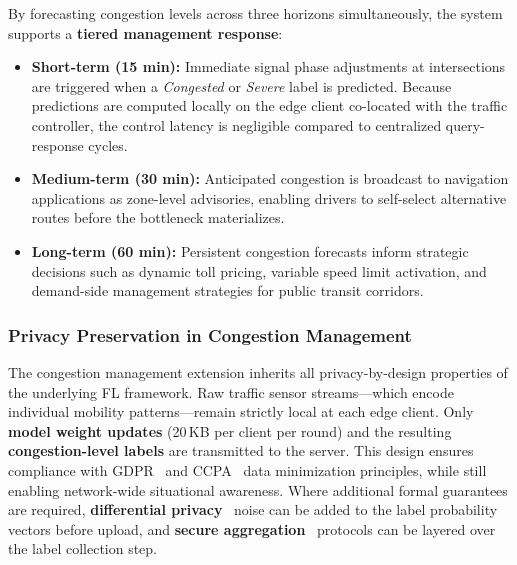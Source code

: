 \documentclass[pdflatex,sn-mathphys-num]{sn-jnl}
\theoremstyle{thmstyleone}
\theoremstyle{thmstyletwo}
\theoremstyle{thmstylethree}
\begin{document}
By forecasting congestion levels across three horizons simultaneously, the system
supports a \textbf{tiered management response}:

\begin{itemize}
    \item \textbf{Short-term (15 min):} Immediate signal phase adjustments at
    intersections are triggered when a \textit{Congested} or \textit{Severe}
    label is predicted. Because predictions are computed locally on the edge
    client co-located with the traffic controller, the control latency is
    negligible compared to centralized query-response cycles.

    \item \textbf{Medium-term (30 min):} Anticipated congestion is broadcast to
    navigation applications as zone-level advisories, enabling drivers to
    self-select alternative routes before the bottleneck materializes.

    \item \textbf{Long-term (60 min):} Persistent congestion forecasts inform
    strategic decisions such as dynamic toll pricing, variable speed limit
    activation, and demand-side management strategies for public transit
    corridors.
\end{itemize}

\subsubsection{Privacy Preservation in Congestion Management}

The congestion management extension inherits all privacy-by-design properties of
the underlying FL framework. Raw traffic sensor streams---which encode individual
mobility patterns---remain strictly local at each edge client. Only
\textbf{model weight updates} (20\,KB per client per round) and the resulting
\textbf{congestion-level labels} are transmitted to the server. This design
ensures compliance with GDPR~\cite{gdpr2016} and CCPA~\cite{tariq2024trustworthy}
data minimization principles, while still enabling network-wide situational
awareness. Where additional formal guarantees are required, \textbf{differential
privacy}~\cite{dwork2014differential} noise can be added to the label probability
vectors before upload, and \textbf{secure aggregation}~\cite{bonawitz2017secagg}
protocols can be layered over the label collection step.
\end{document}
